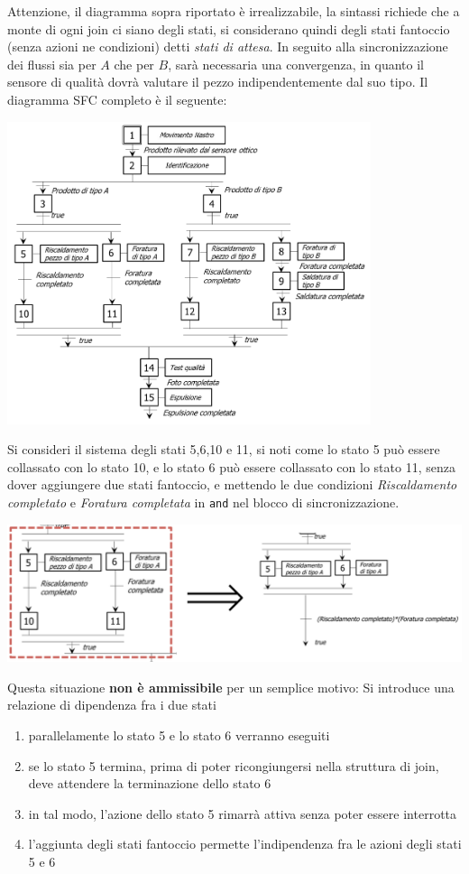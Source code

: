 \documentclass[10pt, letterpaper]{report}
\begin{document}
Attenzione, il diagramma sopra riportato è irrealizzabile, la sintassi richiede che a monte di ogni join ci siano degli stati, si considerano quindi degli stati fantoccio (senza azioni ne condizioni) detti \textit{stati di attesa}.\acc 
In seguito alla sincronizzazione dei flussi sia per $A$ che per $B$, sarà necessaria una convergenza, in quanto il sensore di qualità dovrà valutare il pezzo indipendentemente dal suo tipo. Il diagramma SFC completo è il seguente:
\begin{center}
    \includegraphics[width=0.8\textwidth ]{images/esempioPezzi8.png}
\end{center}
Si consideri il sistema degli stati 5,6,10 e 11, si noti come lo stato 5 può essere collassato con lo stato 10, e lo stato 6 può essere collassato con  lo stato 11, senza dover aggiungere due stati fantoccio, e mettendo le due condizioni \textit{Riscaldamento completato} e \textit{Foratura completata} in \texttt{and} nel blocco di sincronizzazione.
\begin{center}
    \includegraphics[width=1\textwidth ]{images/esempioPezzi9.png}
\end{center}
Questa situazione \textbf{non è ammissibile} per un semplice motivo: Si introduce una relazione di dipendenza fra i due stati\begin{enumerate}
    \item parallelamente lo stato 5 e lo stato 6 verranno eseguiti 
    \item se lo stato 5 termina, prima di poter ricongiungersi nella struttura di join, deve attendere la terminazione dello stato 6 
    \item in tal modo, l'azione dello stato 5 rimarrà attiva senza poter essere interrotta 
    \item l'aggiunta degli stati fantoccio permette l'indipendenza fra le azioni degli stati 5 e 6
\end{enumerate}
\end{document}
